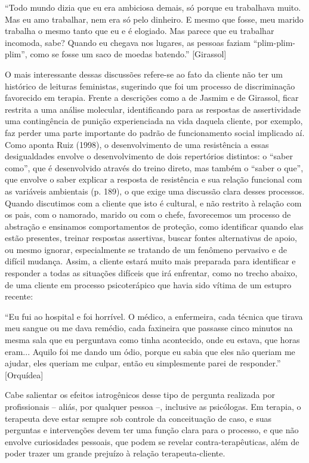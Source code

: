 ``Todo mundo dizia que eu era ambiciosa demais, só porque eu trabalhava muito. Mas eu amo trabalhar, nem era só pelo dinheiro. E mesmo que fosse, meu marido trabalha o mesmo tanto que eu e é elogiado. Mas parece que eu trabalhar incomoda, sabe? Quando eu chegava nos lugares, as pessoas faziam ``plim-plim-plim'', como se fosse um saco de moedas batendo.'' [Girassol]

O mais interessante dessas discussões refere-se ao fato da cliente não ter um histórico de leituras feministas, sugerindo que foi um processo de discriminação favorecido em terapia. Frente a descrições como a de Jasmim e de Girassol, ficar restrita a uma análise molecular, identificando para as respostas de assertividade uma contingência de punição experienciada na vida daquela cliente, por exemplo, faz perder uma parte importante do padrão de funcionamento social implicado aí. Como aponta Ruiz (1998), o desenvolvimento de uma resistência a essas desigualdades envolve o desenvolvimento de dois repertórios distintos: o ``saber como'', que é desenvolvido através do treino direto, mas também o ``saber o que'', que envolve o saber explicar a resposta de resistência e sua relação funcional com as variáveis ambientais (p. 189), o que exige uma discussão clara desses processos. Quando discutimos com a cliente que isto é cultural, e não restrito à relação com os pais, com o namorado, marido ou com o chefe, favorecemos um processo de abstração e ensinamos comportamentos de proteção, como identificar quando elas estão presentes, treinar respostas assertivas, buscar fontes alternativas de apoio, ou mesmo ignorar, especialmente se tratando de um fenômeno pervasivo e de difícil mudança. Assim, a cliente estará muito mais preparada para identificar e responder a todas as situações difíceis que irá enfrentar, como no trecho abaixo, de uma cliente em processo psicoterápico que havia sido vítima de um estupro recente: 

``Eu fui ao hospital e foi horrível. O médico, a enfermeira, cada técnica que tirava meu sangue ou me dava remédio, cada faxineira que passasse cinco minutos na mesma sala que eu perguntava como tinha acontecido, onde eu estava, que horas eram... Aquilo foi me dando um ódio, porque eu sabia que eles não queriam me ajudar, eles queriam me culpar, então eu simplesmente parei de responder.'' [Orquídea] 

Cabe salientar os efeitos iatrogênicos desse tipo de pergunta realizada por profissionais – aliás, por qualquer pessoa –, inclusive as psicólogas. Em terapia, o terapeuta deve estar sempre sob controle da conceituação de caso, e suas perguntas e intervenções devem ter uma função clara para o processo, e que não envolve curiosidades pessoais, que podem se revelar contra-terapêuticas, além de poder trazer um grande prejuízo à relação terapeuta-cliente.

